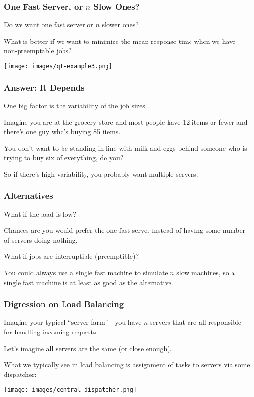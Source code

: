 \begin{frame}
\frametitle{One Fast Server, or $n$ Slow Ones?}

Do we want one fast server or $n$ slower ones? 

What is better if we want to minimize the mean response time when we have non-preemptable jobs?

\begin{center}
	\texttt{[image: images/qt-example3.png]}
\end{center}

\end{frame}



\begin{frame}
\frametitle{Answer: It Depends}

One big factor is the variability of the job sizes. 

Imagine you are at the grocery store and most people have 12 items or fewer and there's one guy who's buying 85 items. 

You don't want to be standing in line with milk and eggs behind someone who is trying to buy six of everything, do you? 

So if there's high variability, you probably want multiple servers.

\end{frame}



\begin{frame}
\frametitle{Alternatives}

What if the load is low? 

Chances are you would prefer the one fast server instead of having some number of servers doing nothing.

What if jobs are interruptible (preemptible)? 

You could always use a single fast machine to simulate $n$ slow machines, so a single fast machine is at least as good as the alternative. 

\end{frame}



\begin{frame}
\frametitle{Digression on Load Balancing}

Imagine your typical ``server farm''---you have $n$ servers that are all responsible for handling incoming requests. 

Let's imagine all servers are the same (or close enough). 

What we typically see in load balancing is assignment of tasks to servers via some dispatcher:

\begin{center}
	\texttt{[image: images/central-dispatcher.png]}
\end{center}

\end{frame}



